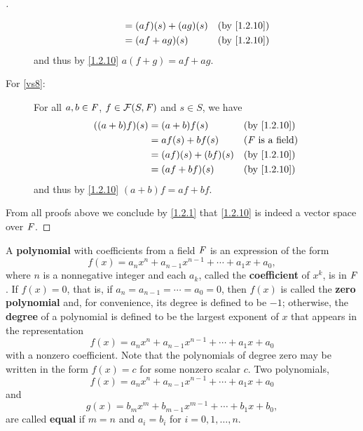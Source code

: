 \begin{proof}[]
\begin{description}
\begin{align*}
                       & = (af)(s) + (ag)(s) &  & \by{1.2.10}                \\
                       & = (af + ag)(s)      &  & \by{1.2.10}
      \end{align*}
      and thus by \cref{1.2.10} \(a (f + g) = af + ag\).
    \item[For \ref{vs8}:]
      For all \(a, b \in \mathit{F}\), \(f \in \mathcal{F}(S, \mathit{F})\) and \(s \in S\), we have
      \begin{align*}
        ((a + b) f)(s) & = (a + b) f(s)      &  & \by{1.2.10}                \\
                       & = af(s) + bf(s)     &  & \text{(\(\F\) is a field)} \\
                       & = (af)(s) + (bf)(s) &  & \by{1.2.10}                \\
                       & = (af + bf)(s)      &  & \by{1.2.10}
      \end{align*}
      and thus by \cref{1.2.10} \((a + b) f = af + bf\).
  \end{description}
  From all proofs above we conclude by \cref{1.2.1} that \cref{1.2.10} is indeed a vector space over \(\mathit{F}\).
\end{proof}

\begin{defn}\label{1.2.11}
  A \textbf{polynomial} with coefficients from a field \(\mathit{F}\) is an expression of the form
  \[
    f(x) = a_n x^n + a_{n - 1} x^{n - 1} + \cdots + a_1 x + a_0,
  \]
  where \(n\) is a nonnegative integer and each \(a_k\), called the \textbf{coefficient} of \(x^k\), is in \(\mathit{F}\).
  If \(f(x) = 0\), that is, if \(a_n = a_{n - 1} = \cdots = a_0 = 0\), then \(f(x)\) is called the \textbf{zero polynomial} and, for convenience, its degree is defined to be \(-1\);
  otherwise, the \textbf{degree} of a polynomial is defined to be the largest exponent of \(x\) that appears in the representation
  \[
    f(x) = a_n x^n + a_{n - 1} x^{n - 1} + \cdots + a_1 x + a_0
  \]
  with a nonzero coefficient.
  Note that the polynomials of degree zero may be written in the form \(f(x) = c\) for some nonzero scalar \(c\).
  Two polynomials,
  \[
    f(x) = a_n x^n + a_{n - 1} x^{n - 1} + \cdots + a_1 x + a_0
  \]
  and
  \[
    g(x) = b_m x^m + b_{m - 1} x^{m - 1} + \cdots + b_1 x + b_0,
  \]
  are called \textbf{equal} if \(m = n\) and \(a_i = b_i\) for \(i = 0, 1, \dots, n\).
\end{defn}

